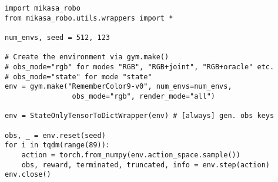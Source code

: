 \begin{lstlisting}[caption={Getting started with MIKASA-Robo using the \texttt{RememberColor9-v0} environment.}, label={lst:quick}]
import mikasa_robo
from mikasa_robo.utils.wrappers import *

num_envs, seed = 512, 123

# Create the environment via gym.make()
# obs_mode="rgb" for modes "RGB", "RGB+joint", "RGB+oracle" etc.
# obs_mode="state" for mode "state"
env = gym.make("RememberColor9-v0", num_envs=num_envs,
                obs_mode="rgb", render_mode="all")

env = StateOnlyTensorToDictWrapper(env) # [always] gen. obs keys

obs, _ = env.reset(seed)
for i in tqdm(range(89)):
    action = torch.from_numpy(env.action_space.sample())
    obs, reward, terminated, truncated, info = env.step(action)
env.close()

\end{lstlisting}